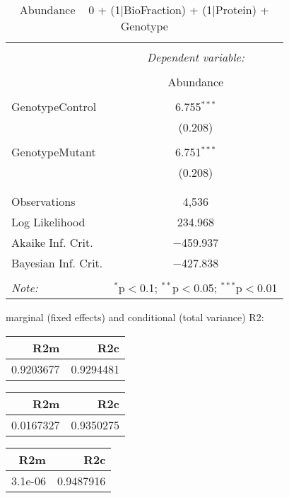 \documentclass[11pt]{report}
\begin{document}
\begin{table}[!htbp] \centering 
  \caption{Abundance ~ 0 + (1|BioFraction) + (1|Protein) + Genotype} 
  \label{} 
\begin{tabular}{@{\extracolsep{5pt}}lc} 
\\[-1.8ex]\hline 
\hline \\[-1.8ex] 
 & \multicolumn{1}{c}{\textit{Dependent variable:}} \\ 
\cline{2-2} 
\\[-1.8ex] & Abundance \\ 
\hline \\[-1.8ex] 
 GenotypeControl & 6.755$^{***}$ \\ 
  & (0.208) \\ 
  & \\ 
 GenotypeMutant & 6.751$^{***}$ \\ 
  & (0.208) \\ 
  & \\ 
\hline \\[-1.8ex] 
Observations & 4,536 \\ 
Log Likelihood & 234.968 \\ 
Akaike Inf. Crit. & $-$459.937 \\ 
Bayesian Inf. Crit. & $-$427.838 \\ 
\hline 
\hline \\[-1.8ex] 
\textit{Note:}  & \multicolumn{1}{r}{$^{*}$p$<$0.1; $^{**}$p$<$0.05; $^{***}$p$<$0.01} \\ 
\end{tabular} 
\end{table} 
marginal (fixed effects) and conditional (total variance) R2:

\begin{tabular}{r|r}
\hline
R2m & R2c\\
\hline
0.9203677 & 0.9294481\\
\hline
\end{tabular}

\begin{tabular}{r|r}
\hline
R2m & R2c\\
\hline
0.0167327 & 0.9350275\\
\hline
\end{tabular}

\begin{tabular}{r|r}
\hline
R2m & R2c\\
\hline
3.1e-06 & 0.9487916\\
\hline
\end{tabular}
\end{document}
